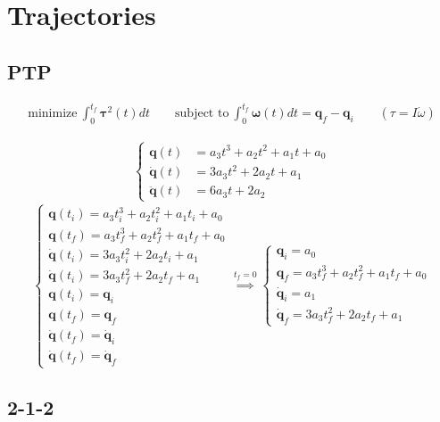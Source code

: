 \section{Trajectories}

\subsection{PTP}

\begin{align*}
	\text{minimize} \ \int_0^{t_f} \bm{\tau}^2(t)dt \qquad
	\text{subject to} \ \int_0^{t_f} \bm{\omega}(t)dt = \bm{q}_f - \bm{q}_i
	\qquad
	(\tau = I\dot{\omega})
\end{align*}

\begin{gather*}
\begin{cases}
\bm{q}(t) &= a_3t^3 + a_2t^2 + a_1t + a_0 \\
\bm{\dot{q}}(t) &= 3a_3t^2 + 2a_2t + a_1 \\
\bm{\ddot{q}}(t) &= 6a_3t + 2a_2
\end{cases}
\end{gather*}
\vspace*{7pt}
$$
\begin{cases*}
	\bm{q}(t_i) = a_3t_i^3 + a_2t_i^2 + a_1t_i + a_0 \\
	\bm{q}(t_f) = a_3t_f^3 + a_2t_f^2 + a_1t_f + a_0 \\
	\bm{\dot{q}}(t_i) = 3a_3t_i^2 + 2a_2t_i + a_1 \\
	\bm{\dot{q}}(t_i) = 3a_3t_f^2 + 2a_2t_f + a_1 \\
	\bm{q}(t_i) = \bm{q}_i \\
	\bm{q}(t_f) = \bm{q}_f \\
	\bm{\dot{q}}(t_f) = \bm{\dot{q}}_i \\
	\bm{\dot{q}}(t_f) = \bm{\dot{q}}_f
\end{cases*}
\overset{t_f = 0}{\implies}
\begin{cases*}
	\bm{q}_i = a_0 \\
	\bm{q}_f = a_3t_f^3 + a_2t_f^2 + a_1t_f + a_0 \\
	\bm{\dot{q}}_i = a_1 \\
	\bm{\dot{q}}_f = 3a_3t_f^2 + 2a_2t_f + a_1
\end{cases*}
$$



\subsection{2-1-2}

